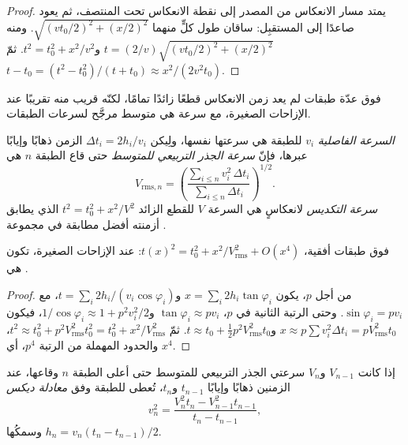 \begin{proof}
يمتد مسار الانعكاس من المصدر إلى نقطة الانعكاس تحت
المنتصف، ثم يعود صاعدًا إلى المستقبِل: ساقان طول كلٍّ منهما
$\sqrt{(vt_0/2)^2 + (x/2)^2}$. ومنه $t = (2/v)\sqrt{(vt_0/2)^2 + (x/2)^2}$
و$t^2 = t_0^2 + x^2/v^2$. ثمّ $t - t_0 = (t^2 - t_0^2)/(t + t_0) \approx
x^2/(2v^2t_0)$.
\end{proof}

فوق عدّة طبقات لم يعد زمن الانعكاس قطعًا زائدًا تمامًا، لكنّه
قريب منه تقريبًا عند الإزاحات الصغيرة، مع سرعة هي متوسط مرجَّح لسرعات
الطبقات.

\begin{definition}\label{def:b3:exploration-seismology:velocities}
\emph{السرعة الفاصلية} $v_i$ للطبقة هي
سرعتها نفسها، ولِيكن $\Delta t_i = 2h_i/v_i$ الزمن ذهابًا وإيابًا عبرها، فإنّ
\emph{سرعة الجذر التربيعي للمتوسط} حتى
قاع الطبقة $n$ هي
\[
  V_{\text{rms},n} = \left(\frac{\sum_{i\le n}v_i^2\,\Delta t_i}{\sum_{i\le n}\Delta t_i}\right)^{1/2}.
\]
\emph{سرعة التكديس} لانعكاسٍ هي
السرعة $V$ للقطع الزائد $t^2 = t_0^2 + x^2/V^2$ الذي يطابق أزمنته أفضل مطابقة في
مجموعة .
\end{definition}

\begin{proposition}\label{prop:b3:exploration-seismology:rms}
فوق طبقات أفقية، $t(x)^2 = t_0^2 + x^2/V_{\text{rms}}^2 + O(x^4)$: عند الإزاحات الصغيرة،
تكون  هي .
\end{proposition}

\begin{proof}
من أجل  $p$، يكون $x = \sum_i 2h_i\tan\varphi_i$
و$t = \sum_i 2h_i/(v_i\cos\varphi_i)$، مع $\sin\varphi_i = pv_i$. وحتى الرتبة الثانية
في $p$، $\tan\varphi_i \approx pv_i$ و$1/\cos\varphi_i \approx 1 +
p^2v_i^2/2$، فيكون $x \approx p\sum v_i^2\Delta t_i = pV_{\text{rms}}^2t_0$
و$t \approx t_0 + \tfrac12p^2V_{\text{rms}}^2t_0$. ثمّ
$t^2 \approx t_0^2 + p^2V_{\text{rms}}^2t_0^2 = t_0^2 + x^2/V_{\text{rms}}^2$، والحدود
المهملة من الرتبة $p^4$، أي $x^4$.
\end{proof}

\begin{theorem}\label{thm:b3:exploration-seismology:dix}
إذا كانت $V_{n-1}$ و$V_n$ سرعتي الجذر التربيعي للمتوسط حتى أعلى
الطبقة $n$ وقاعها، عند الزمنين ذهابًا وإيابًا $t_{n-1}$ و$t_n$، تُعطى  للطبقة
وفق \emph{معادلة ديكس}
\[
  v_n^2 = \frac{V_n^2t_n - V_{n-1}^2t_{n-1}}{t_n - t_{n-1}} ,
\]
وسمكُها $h_n = v_n(t_n - t_{n-1})/2$.
\end{theorem}


